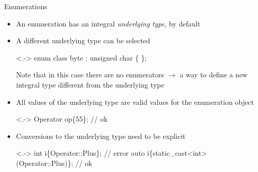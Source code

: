 \begin{frame}[fragile]{Enumerations \insertcontinuationtext}

  \begin{itemize}[<+->]
  \item An enumeration has an integral \textit{underlying type}, by default 
  \item A different underlying type can be selected
    \begin{codeblock}<.->{
enum class byte : unsigned char \{ \};}\end{codeblock}

    Note that in this case there are no enumerators $\rightarrow$ a way to define a
    new integral type different from the underlying type

  \item All values of the underlying type are valid values for the enumeration
    object

    \begin{codeblock}<.->
Operator op\{55\};  // ok\end{codeblock}

  \item Conversions to the underlying type need to be explicit

    \begin{codeblock}<.->
int i\{Operator::Plus\};                     // error
auto i\{static_cast<int>(Operator::Plus)\};  // ok\end{codeblock}

  \end{itemize}

\end{frame}

